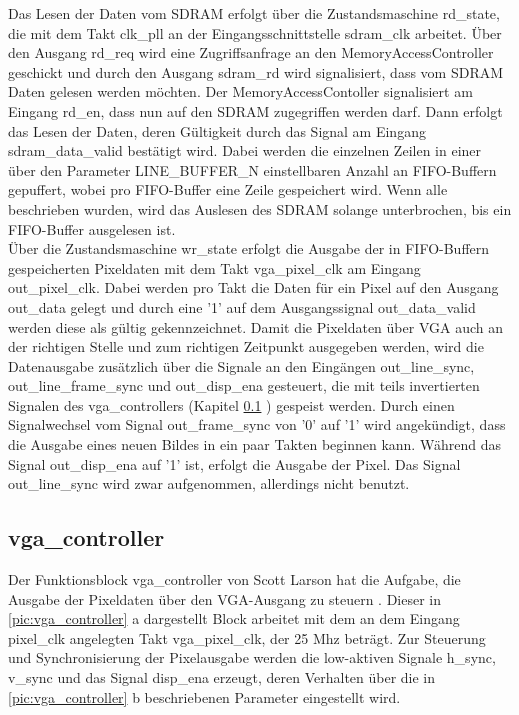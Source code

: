 \documentclass[ngerman,12pt]{article} %
\begin{document}
{Das Lesen der Daten vom SDRAM erfolgt über die Zustandsmaschine rd\_state, die mit dem Takt clk\_pll an der Eingangsschnittstelle sdram\_clk arbeitet. Über den Ausgang rd\_req wird eine Zugriffsanfrage an den MemoryAccessController geschickt und durch den Ausgang sdram\_rd wird signalisiert, dass vom SDRAM Daten gelesen werden möchten. Der MemoryAccessContoller signalisiert am Eingang rd\_en, dass nun auf den SDRAM zugegriffen werden darf. Dann erfolgt das Lesen der Daten, deren Gültigkeit durch das Signal am Eingang sdram\_data\_valid bestätigt wird. Dabei werden die einzelnen Zeilen in einer über den Parameter LINE\_BUFFER\_N einstellbaren Anzahl an FIFO-Buffern gepuffert, wobei pro FIFO-Buffer eine Zeile gespeichert wird. Wenn alle beschrieben wurden, wird das Auslesen des SDRAM solange unterbrochen, bis ein FIFO-Buffer ausgelesen ist.\\
Über die Zustandsmaschine wr\_state erfolgt die Ausgabe der in FIFO-Buffern gespeicherten Pixeldaten mit dem Takt vga\_pixel\_clk  am Eingang out\_pixel\_clk. Dabei werden pro Takt die Daten für ein Pixel auf den Ausgang out\_data gelegt und durch eine '1' auf dem Ausgangssignal out\_data\_valid werden diese als gültig gekennzeichnet. Damit die Pixeldaten über VGA auch an der richtigen Stelle und zum richtigen Zeitpunkt ausgegeben werden, wird die Datenausgabe zusätzlich über die Signale an den Eingängen out\_line\_sync, out\_line\_frame\_sync und out\_disp\_ena  gesteuert, die mit teils invertierten Signalen des vga\_controllers (Kapitel \ref{sec:vga_controller} ) gespeist werden. Durch einen Signalwechsel vom Signal out\_frame\_sync von '0' auf '1' wird angekündigt, dass die Ausgabe eines neuen Bildes in ein paar Takten beginnen kann. Während das Signal out\_disp\_ena auf '1' ist, erfolgt die Ausgabe der Pixel. Das Signal  out\_line\_sync wird zwar aufgenommen, allerdings nicht benutzt.



\subsection{vga\_controller}
\label{sec:vga_controller}
Der Funktionsblock vga\_controller von Scott Larson hat die Aufgabe, die Ausgabe der Pixeldaten über den VGA-Ausgang zu steuern \cite{Digi-Key}. Dieser in \autoref{pic:vga_controller} a dargestellt Block arbeitet mit dem an dem Eingang pixel\_clk angelegten Takt vga\_pixel\_clk, der 25 Mhz beträgt. Zur Steuerung und Synchronisierung der Pixelausgabe werden die low-aktiven Signale h\_sync, v\_sync und das Signal disp\_ena erzeugt, deren Verhalten über die in \autoref{pic:vga_controller} b beschriebenen Parameter eingestellt wird.\newline

}
\end{document}
